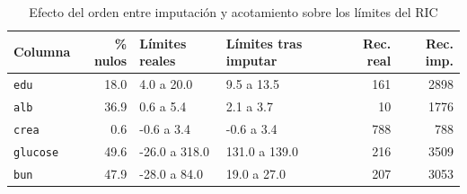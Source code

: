 \begin{table}[H]
\centering
\caption{Efecto del orden entre imputación y acotamiento sobre los límites del RIC}
\label{tab:ordenric}
\small
\begin{tabular}{l r p{2.4cm} p{2.4cm} r r}
\toprule
\textbf{Columna} & \textbf{\% nulos} & \textbf{Límites reales} & \textbf{Límites tras imputar} & \textbf{Rec. real} & \textbf{Rec. imp.} \\
\midrule
\texttt{edu} & 18.0 & 4.0 a 20.0 & 9.5 a 13.5 & 161 & 2898 \\
\texttt{alb} & 36.9 & 0.6 a 5.4 & 2.1 a 3.7 & 10 & 1776 \\
\texttt{crea} & 0.6 & -0.6 a 3.4 & -0.6 a 3.4 & 788 & 788 \\
\texttt{glucose} & 49.6 & -26.0 a 318.0 & 131.0 a 139.0 & 216 & 3509 \\
\texttt{bun} & 47.9 & -28.0 a 84.0 & 19.0 a 27.0 & 207 & 3053 \\
\bottomrule
\end{tabular}
\end{table}
